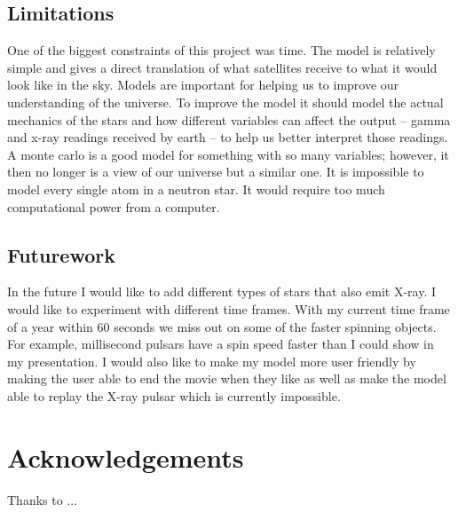 \documentclass[final,6p,times,twocolumn,authoryear]{elsarticle}
\begin{document}
\subsection{Limitations}

One of the biggest constraints of this project was time. The model is relatively simple and gives a direct translation of what satellites receive to what it would look like in the sky. Models are important for helping us to improve our understanding of the universe. To improve the model it should model the actual mechanics of the stars and how different variables can affect the output – gamma and x-ray readings received by earth – to help us better interpret those readings. 
	A monte carlo is a good model for something with so many variables; however, it then no longer is a view of our universe but a similar one. It is impossible to model every single atom in a neutron star. It would require too much computational power from a computer. 

\subsection{Futurework}
In the future I would like to add different types of stars that also emit X-ray. I would like to experiment with different time frames. With my current time frame of a year within 60 seconds we miss out on some of the faster spinning objects. For example, millisecond pulsars have a spin speed faster than I could show in my presentation. I would also like to make my model more user friendly by making the user able to end the movie when they like as well as make the model able to replay the X-ray pulsar which is currently impossible. 


\section*{Acknowledgements}
Thanks to ...


% 
%
\end{document}
